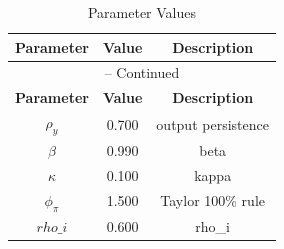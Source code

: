 \begin{center}
\begin{longtable}{ccc}
\caption{Parameter Values}\\%
\toprule%
\multicolumn{1}{c}{\textbf{Parameter}} &
\multicolumn{1}{c}{\textbf{Value}} &
 \multicolumn{1}{c}{\textbf{Description}}\\%
\midrule%
\endfirsthead
\multicolumn{3}{c}{{\tablename} \thetable{} -- Continued}\\%
\midrule%
\multicolumn{1}{c}{\textbf{Parameter}} &
\multicolumn{1}{c}{\textbf{Value}} &
  \multicolumn{1}{c}{\textbf{Description}}\\%
\midrule%
\endhead
$\rho_y$ 	 & 	 0.700 	 & 	 output persistence\\
$\beta$ 	 & 	 0.990 	 & 	 beta\\
$\kappa$ 	 & 	 0.100 	 & 	 kappa\\
$\phi_\pi$ 	 & 	 1.500 	 & 	 Taylor 100\% rule\\
$rho\_i$ 	 & 	 0.600 	 & 	 rho\_i\\
\bottomrule%
\end{longtable}
\end{center}

